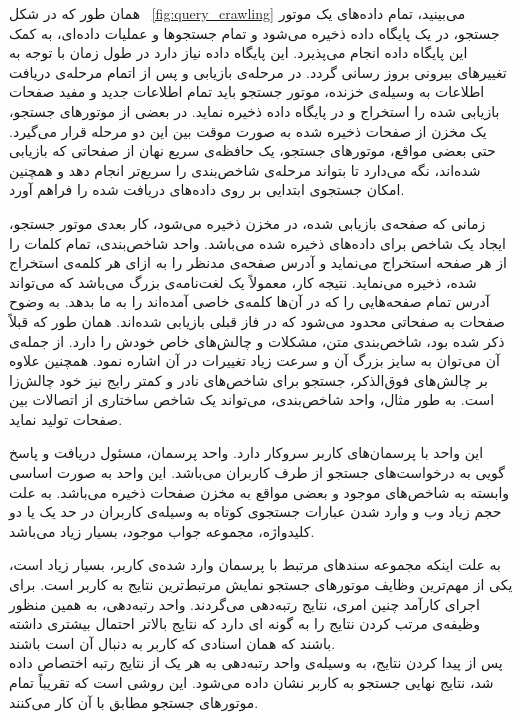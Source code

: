 همان طور که در شکل ~\ref{fig:query_crawling} می‌بینید، تمام داده‌های یک موتور جستجو، در یک پایگاه داده ذخیره می‌شود و تمام جستجوها و عملیات داده‌ای، به کمک این پایگاه داده انجام می‌پذیرد. این پایگاه داده نیاز دارد در طول زمان با توجه به تغییرهای بیرونی بروز رسانی گردد. در مرحله‌ی بازیابی و پس از اتمام مرحله‌ی دریافت اطلاعات به وسیله‌ی خزنده، موتور جستجو باید تمام اطلاعات جدید و مفید صفحات بازیابی شده را استخراج و در پایگاه داده ذخیره نماید. در بعضی از موتورهای جستجو، یک مخزن از صفحات ذخیره شده به صورت موقت بین این دو مرحله قرار می‌گیرد. حتی بعضی مواقع، موتورهای جستجو، یک حافظه‌ی سریع نهان از صفحاتی که بازیابی شده‌اند، نگه می‌دارد تا بتواند مرحله‌ی شاخص‌بندی را سریع‌تر انجام دهد و همچنین امکان جستجوی ابتدایی بر روی داده‌های دریافت شده را فراهم آورد.

زمانی که صفحه‌ی بازیابی شده، در مخزن ذخیره می‌شود، کار بعدی موتور جستجو، ایجاد یک شاخص برای داده‌های ذخیره شده می‌باشد. واحد شاخص‌بندی، تمام کلمات را از هر صفحه استخراج می‌نماید و آدرس صفحه‌ی مدنظر را به ازای هر کلمه‌ی استخراج شده، ذخیره می‌نماید. نتیجه کار، معمولاً یک لغت‌نامه‌ی بزرگ می‌باشد که می‌تواند آدرس تمام صفحه‌هایی را که در آن‌ها کلمه‌ی خاصی آمده‌اند را به ما بدهد. به وضوح صفحات به صفحاتی محدود می‌شود که در فاز قبلی بازیابی شده‌اند. همان طور که قبلاً ذکر شده بود، شاخص‌بندی متن، مشکلات و چالش‌های خاص خودش را دارد. از جمله‌ی آن می‌توان به سایز بزرگ آن و سرعت زیاد تغییرات در آن اشاره نمود. همچنین علاوه بر چالش‌های فوق‌الذکر، جستجو برای شاخص‌های نادر و کمتر رایج نیز خود چالش‌زا است. به طور مثال، واحد شاخص‌بندی، می‌تواند یک شاخص ساختاری از اتصالات بین صفحات تولید نماید.

این واحد با پرسمان‌های کاربر سروکار دارد. واحد پرسمان، مسئول دریافت و پاسخ گویی به درخواست‌های جستجو از طرف کاربران می‌باشد. این واحد به صورت اساسی وابسته به شاخص‌های موجود و بعضی مواقع به مخزن صفحات ذخیره می‌باشد. به علت حجم زیاد وب و وارد شدن عبارات جستجوی کوتاه به وسیله‌ی کاربران در حد یک یا دو کلیدواژه، مجموعه جواب موجود، بسیار زیاد می‌باشد.

به علت اینکه مجموعه سندهای مرتبط با پرسمان وارد شده‌ی کاربر، بسیار زیاد است، یکی از مهم‌ترین وظایف موتورهای جستجو نمایش مرتبط‌ترین نتایج به کاربر است. برای اجرای کارآمد چنین امری، نتایج رتبه‌دهی می‌گردند. واحد رتبه‌دهی، به همین منظور وظیفه‌ی مرتب کردن نتایج را به گونه ای دارد که نتایج بالاتر احتمال بیشتری داشته باشند که همان اسنادی که کاربر به دنبال آن است باشند.
\\
پس از پیدا کردن نتایج، به وسیله‌ی واحد رتبه‌دهی به هر یک از نتایج رتبه اختصاص داده شد، نتایج نهایی جستجو به کاربر نشان داده می‌شود. این روشی است که تقریباً تمام موتورهای جستجو مطابق با آن کار می‌کنند.

